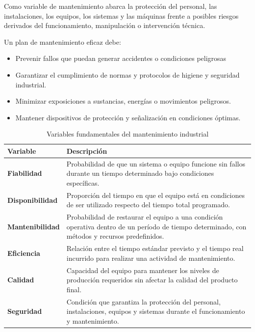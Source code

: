 \documentclass[a4paper,oneside,11pt]{article}
\begin{document}
\begin{enumerate}
    Como variable de mantenimiento abarca la protección del personal, las instalaciones, los equipos, los sistemas y las máquinas frente a posibles riesgos derivados del funcionamiento, manipulación o intervención técnica.

    Un plan de mantenimiento eficaz debe:

    \begin{itemize}
        \item Prevenir fallos que puedan generar accidentes o condiciones peligrosas
        \item Garantizar el cumplimiento de normas y protocolos de higiene y seguridad industrial.
        \item Minimizar exposiciones a sustancias, energías o movimientos peligrosos.
        \item Mantener dispositivos de protección y señalización en condiciones óptimas.
    \end{itemize}

\begin{table}[H]
\centering
\begin{tabular}{|l|p{12cm}|}
\hline
\textbf{Variable} & \textbf{Descripción} \\ \hline

\textbf{Fiabilidad} & Probabilidad de que un sistema o equipo funcione sin fallos durante un tiempo determinado bajo condiciones específicas. \\ \hline

\textbf{Disponibilidad} & Proporción del tiempo en que el equipo está en condiciones de ser utilizado respecto del tiempo total programado. \\ \hline

\textbf{Mantenibilidad} & Probabilidad de restaurar el equipo a una condición operativa dentro de un período de tiempo determinado, con métodos y recursos predefinidos. \\ \hline

\textbf{Eficiencia} & Relación entre el tiempo estándar previsto y el tiempo real incurrido para realizar una actividad de mantenimiento. \\ \hline

\textbf{Calidad} & Capacidad del equipo para mantener los niveles de producción requeridos sin afectar la calidad del producto final. \\ \hline

\textbf{Seguridad} & Condición que garantiza la protección del personal, instalaciones, equipos y sistemas durante el funcionamiento y mantenimiento. \\ \hline

\end{tabular}
\caption{Variables fundamentales del mantenimiento industrial}
\end{table}


\end{enumerate}
\end{document}
